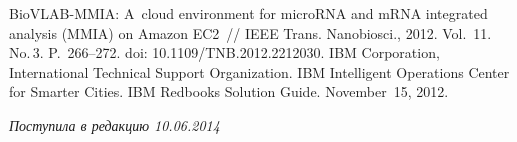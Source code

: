 \begin{multicols}{2}
{{\begin{thebibliography}{99}
BioVLAB-MMIA: A~cloud environment for microRNA and mRNA integrated analysis (MMIA) on
Amazon EC2~// IEEE Trans. Nanobiosci., 2012. Vol.~11. No.\,3. P.~266--272.
doi: 10.1109/TNB.2012.2212030.
IBM Corporation, International Technical Support Organization.
IBM Intelligent Operations Center for Smarter Cities.
IBM Redbooks Solution Guide. November~15, 2012.


\end{thebibliography}
} }

\end{multicols}

 \label{end\stat}

 \vspace*{-6pt}

\hfill{\small\textit{Поступила в редакцию 10.06.2014}}
\renewcommand{\figurename}{\protect\bf Рис.}
